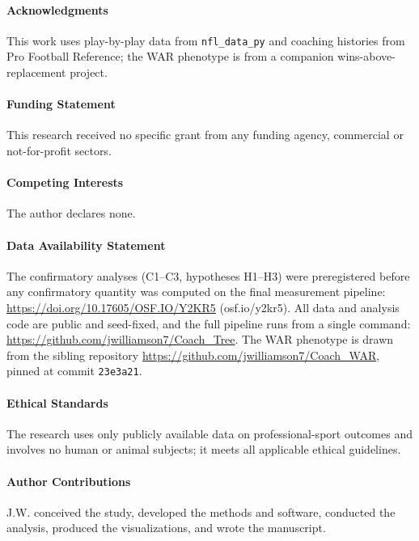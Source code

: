 \documentclass[
  journal=ehs,
  manuscript=article,
  year=2026,
  volume=8,
]{cup-journal}
\newif\ifblind
\begin{document}

\paragraph{Acknowledgments}
This work uses play-by-play data from \texttt{nfl\_data\_py} and coaching histories
from Pro Football Reference; the WAR phenotype is from a companion
wins-above-replacement project.

\paragraph{Funding Statement}
This research received no specific grant from any funding agency, commercial or
not-for-profit sectors.

\paragraph{Competing Interests}
The author declares none.

\paragraph{Data Availability Statement}
\ifblind
The confirmatory analyses (C1--C3, hypotheses H1--H3) were preregistered before any
confirmatory quantity was computed on the final measurement pipeline. All data and
analysis code are public and seed-fixed, and the full pipeline runs from a single
command; the preregistration, data, and code repository links are withheld here to
preserve author anonymity and will be provided on acceptance.
\else
The confirmatory analyses (C1--C3, hypotheses H1--H3) were preregistered before any
confirmatory quantity was computed on the final measurement pipeline:
\url{https://doi.org/10.17605/OSF.IO/Y2KR5} (osf.io/y2kr5). All data and analysis
code are public and seed-fixed, and the full pipeline runs from a single command:
\url{https://github.com/jwilliamson7/Coach_Tree}. The WAR phenotype is drawn from
the sibling repository \url{https://github.com/jwilliamson7/Coach_WAR}, pinned at
commit \texttt{23e3a21}.
\fi

\paragraph{Ethical Standards}
The research uses only publicly available data on professional-sport outcomes and
involves no human or animal subjects; it meets all applicable ethical guidelines.

\paragraph{Author Contributions}
J.W. conceived the study, developed the methods and software, conducted the
analysis, produced the visualizations, and wrote the manuscript.

\printbibliography
\end{document}
